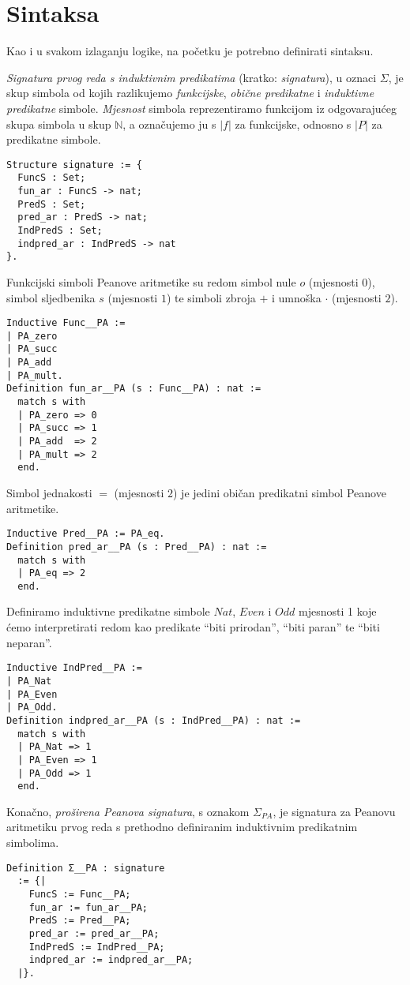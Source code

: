 \section{Sintaksa}\label{sec:sintaksa}
Kao i u svakom izlaganju logike, na početku je potrebno definirati sintaksu.
\begin{definition}\label{def:signatura}
  \textit{Signatura prvog reda s induktivnim predikatima} (kratko: \textit{signatura}), u oznaci \(\Sigma\),
  je skup simbola od kojih razlikujemo \textit{funkcijske}, \textit{obične predikatne}
  i \textit{induktivne predikatne} simbole.
  \textit{Mjesnost} simbola reprezentiramo funkcijom iz odgovarajućeg skupa simbola u skup \(\mathbb{N}\),
  a označujemo ju s \(|f|\) za funkcijske, odnosno s \(|P|\) za predikatne simbole.
  \begin{verbatim}
Structure signature := {
  FuncS : Set;
  fun_ar : FuncS -> nat;
  PredS : Set;
  pred_ar : PredS -> nat;
  IndPredS : Set;
  indpred_ar : IndPredS -> nat
}.
\end{verbatim}
\end{definition}
\begin{example}
  Funkcijski simboli Peanove aritmetike su redom simbol nule \(o\) (mjesnosti \(0\)),
  simbol sljedbenika \(s\) (mjesnosti \(1\))
  te simboli zbroja \(+\) i umnoška \(\cdot\) (mjesnosti \(2\)).
\begin{verbatim}
Inductive Func__PA :=
| PA_zero
| PA_succ
| PA_add
| PA_mult.
Definition fun_ar__PA (s : Func__PA) : nat :=
  match s with
  | PA_zero => 0
  | PA_succ => 1
  | PA_add  => 2
  | PA_mult => 2
  end.
\end{verbatim}
  \noindent Simbol jednakosti \(=\) (mjesnosti \(2\)) je jedini običan predikatni simbol
  Peanove aritmetike.
\begin{verbatim}
Inductive Pred__PA := PA_eq.
Definition pred_ar__PA (s : Pred__PA) : nat :=
  match s with
  | PA_eq => 2
  end.
\end{verbatim}
  \noindent Definiramo induktivne predikatne simbole
  \(\mathit{Nat}\), \(\mathit{Even}\) i \(\mathit{Odd}\) mjesnosti 1 koje ćemo
  interpretirati redom kao predikate \enquote{biti prirodan}, \enquote{biti paran} te
  \enquote{biti neparan}.
\begin{verbatim}
Inductive IndPred__PA :=
| PA_Nat
| PA_Even
| PA_Odd.
Definition indpred_ar__PA (s : IndPred__PA) : nat :=
  match s with
  | PA_Nat => 1
  | PA_Even => 1
  | PA_Odd => 1
  end.
\end{verbatim}
  \noindent Konačno, \textit{proširena Peanova signatura}, s oznakom \(\Sigma_{\mathit{PA}}\), je signatura za
  Peanovu aritmetiku prvog reda s prethodno definiranim induktivnim predikatnim simbolima.
\begin{verbatim}
Definition Σ__PA : signature
  := {|
    FuncS := Func__PA;
    fun_ar := fun_ar__PA;
    PredS := Pred__PA;
    pred_ar := pred_ar__PA;
    IndPredS := IndPred__PA;
    indpred_ar := indpred_ar__PA;
  |}.
\end{verbatim}
\end{example}
